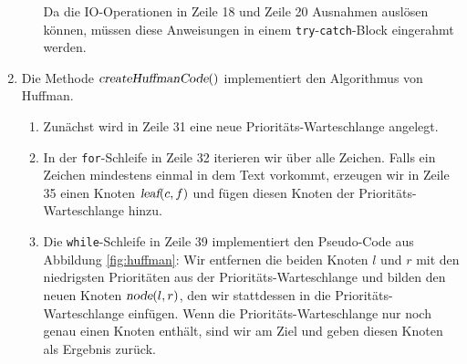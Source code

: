 \begin{enumerate}
\begin{enumerate}
            Da die IO-Operationen in Zeile 18 und Zeile 20 Ausnahmen ausl\"osen k\"onnen,
            m\"ussen diese Anweisungen in einem \texttt{try}-\texttt{catch}-Block eingerahmt
            werden.
      \end{enumerate}
\item Die Methode $\textsl{createHuffmanCode}()$ implementiert den Algorithmus von Huffman.
      \begin{enumerate}
      \item Zun\"achst wird in Zeile 31 eine neue Priorit\"ats-Warteschlange angelegt.
      \item In der \texttt{for}-Schleife in Zeile 32 iterieren wir \"uber alle Zeichen.
            Falls ein Zeichen mindestens einmal in dem Text vorkommt,
            erzeugen wir in Zeile 35 einen Knoten $\textsl{leaf}(c,f)$ und f\"ugen diesen
            Knoten der Priorit\"ats-Warteschlange hinzu.
      \item Die \texttt{while}-Schleife in Zeile 39 implementiert den Pseudo-Code aus 
            Abbildung \ref{fig:huffman}:  Wir entfernen die beiden Knoten $l$ und $r$ mit den
            niedrigsten Priorit\"aten aus der Priorit\"ats-Warteschlange und bilden den neuen
            Knoten $\textsl{node}(l,r)$, den wir stattdessen in die
            Priorit\"ats-Warteschlange einf\"ugen.  Wenn die Priorit\"ats-Warteschlange nur noch
            genau einen Knoten enth\"alt, sind wir am Ziel und geben diesen Knoten 
            als Ergebnis zur\"uck.
      \end{enumerate}
\end{enumerate}

